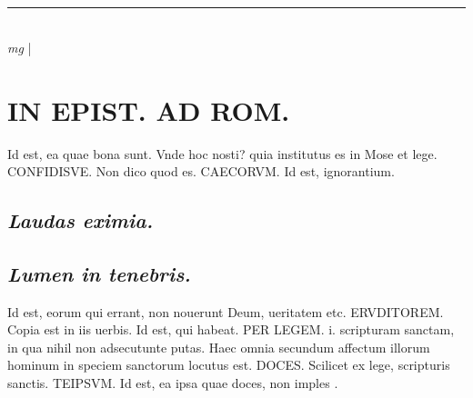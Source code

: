 \documentclass{article}
\begin{document}
\begin{pages}
\section*{}
\marginpar{[ p.]}
{}
\subsection*{\textit{}}
{}
\subsection*{\textit{}}\pstart  \pend\pstart  \pend
{}
{}
\subsection*{\textit{}}
\vspace{0.5cm}\noindent
\vspace{0.2cm}\rule{1cm}{0.2pt}\\ 
\hspace{0.2cm}\textit{mg}
\footnotesize 
\normalsize| 
\section*{IN EPIST. AD ROM.  }
\marginpar{[ p.21 ]}\pstart Id est, ea quae bona sunt. Vnde hoc nosti? quia institutus es in Mose et lege. CONFIDISVE. Non dico quod es. CAECORVM.  Id est, ignorantium.   \pend
{}
{}
\subsection*{\textit{Laudas eximia. }}
{}
\subsection*{\textit{Lumen in tenebris. }}\pstart Id est, eorum qui errant, non nouerunt Deum, ueritatem etc. ERVDITOREM. Copia est in iis uerbis.  \pend\pstart Id est, qui habeat. PER LEGEM. i. scripturam sanctam, in qua nihil non adsecutunte putas. Haec omnia secundum affectum illorum hominum in speciem sanctorum locutus est. DOCES. Scilicet ex lege, scripturis sanctis. TEIPSVM.  Id est, ea ipsa quae doces, non imples .   \pend
{}
{}

\end{pages}
\end{document}
